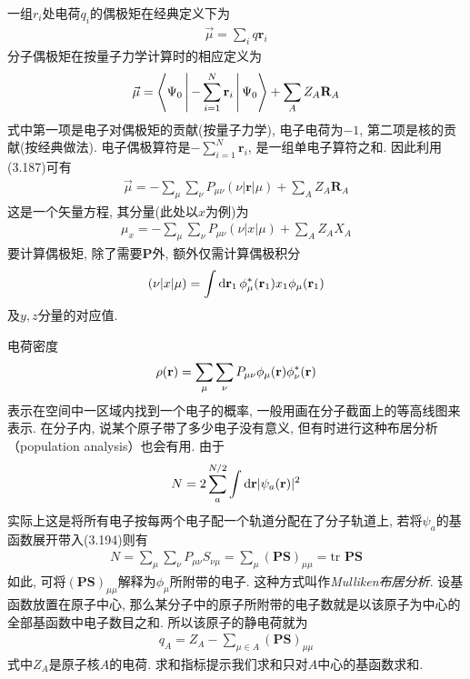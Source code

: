 一组$r_i$处电荷$q_i$的偶极矩在经典定义下为
\begin{align}
	\vec{\mu} = \sum_i q\mathbf{r}_i
\end{align}
分子偶极矩在按量子力学计算时的相应定义为
\begin{align}
	\vec{\mu} = \Braket{\Psi_0|-\sum_{i=1}^{N}\mathbf{r}_i|\Psi_0} + \sum_AZ_A\mathbf{R}_A
\end{align}
式中第一项是电子对偶极矩的贡献(按量子力学), 
电子电荷为$-1$, 
第二项是核的贡献(按经典做法). 
电子偶极算符是$-\sum_{i=1}^{N}\mathbf{r}_i$, 
是一组单电子算符之和. 
因此利用(3.187)可有
\begin{align}
	\vec{\mu} = -\sum_\mu\sum_\nu P_{\mu\nu}(\nu|\mathbf{r}|\mu) + \sum_AZ_A\mathbf{R}_A
\end{align}
这是一个矢量方程, 
其分量(此处以$x$为例)为
\begin{align}
	\mu_x = -\sum_\mu\sum_\nu P_{\mu\nu}(\nu|x|\mu) + \sum_AZ_AX_A
\end{align}
要计算偶极矩, 
除了需要$\mathbf{P}$外, 
额外仅需计算偶极积分
\begin{align}
	(\nu|x|\mu) = \int\dd{r}_1\,\phi_\mu^*(\bfr_1)x_1\phi_\mu(\bfr_1)
\end{align}
及$y,z$分量的对应值.


电荷密度
\begin{align}
	\rho(\mathbf{r}) = \sum_\mu\sum_\nu P_{\mu\nu}\phi_\mu(\mathbf{r})\phi_\nu^*(\mathbf{r})
\end{align}
表示在空间中一区域内找到一个电子的概率, 一般用画在分子截面上的等高线图来表示. 
在分子内, 说某个原子带了多少电子没有意义, 但有时进行这种布居分析（population analysis）也会有用. 由于
\begin{align}
	N = 2\sum_{a}^{N/2}\int\dd{r}|\psi_a(\bfr)|^2
\end{align}
实际上这是将所有电子按每两个电子配一个轨道分配在了分子轨道上, 
若将$\psi_a$的基函数展开带入(3.194)则有
\begin{align}
	N = \sum_\mu\sum_\nu P_{\mu\nu}S_{\nu\mu} = \sum_\mu(\mathbf{PS})_{\mu\mu} = \mathrm{tr}\,\,\mathbf{PS}
\end{align}
如此, 
可将$(\mathbf{PS})_{\mu\mu}$解释为$\phi_\mu$所附带的电子. 
这种方式叫作\emph{Mulliken布居分析}. 
设基函数放置在原子中心, 
那么某分子中的原子所附带的电子数就是以该原子为中心的全部基函数中电子数目之和. 
所以该原子的静电荷就为
\begin{align}
	q_A = Z_A - \sum_{\mu\in A}(\mathbf{PS})_{\mu\mu}
\end{align}
式中$Z_A$是原子核$A$的电荷. 
求和指标提示我们求和只对$A$中心的基函数求和.


